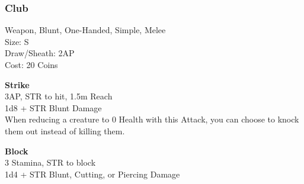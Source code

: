 \subsubsection{Club}\label{weapon:club}
Weapon, Blunt, One-Handed, Simple, Melee\\
Size: S\\
Draw/Sheath: 2AP\\
Cost: 20 Coins

\textbf{Strike}\\
3AP, STR to hit, 1.5m Reach\\
1d8 + \texttimes STR Blunt Damage\\
When reducing a creature to 0 Health with this Attack, you can choose to knock them out instead of killing them.

\textbf{Block}\\
3 Stamina, STR to block\\
1d4 + \texttimes STR Blunt, Cutting, or Piercing Damage


